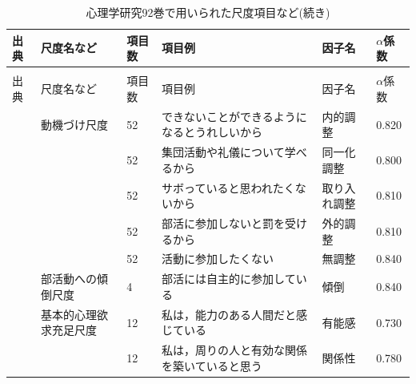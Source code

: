 \begin{landscape}
	\begin{longtable}{p{2cm}p{2cm}p{2cm}p{6cm}p{2cm}p{2cm}}
		\caption{心理学研究92巻で用いられた尺度項目など}
		\label{JPA92Scales} \\
		\hline
		出典                       & 尺度名など                            & 項目数 & 項目例                                                 & 因子名                  & $\alpha$係数 \\ \hline
		\hline \endfirsthead
		\caption[]{心理学研究92巻で用いられた尺度項目など(続き)} \\
		\hline
		出典                       & 尺度名など                            & 項目数 & 項目例                                                 & 因子名                  & $\alpha$係数 \\ \hline
		\hline \endhead
		\textcite{Suzuki202192}     & 動機づけ尺度                           & 52  & できないことができるようになるとうれしいから                              & 内的調整                 & 0.820      \\
		                         &                                  & 52  & 集団活動や礼儀について学べるから                                    & 同一化調整                & 0.800      \\
		                         &                                  & 52  & サボっていると思われたくないから                                    & 取り入れ調整               & 0.810      \\
		                         &                                  & 52  & 部活に参加しないと罰を受けるから                                    & 外的調整                 & 0.810      \\
		                         &                                  & 52  & 活動に参加したくない                                          & 無調整                  & 0.840      \\
		                         & 部活動への傾倒尺度                        & 4   & 部活には自主的に参加している                                      & 傾倒                   & 0.840      \\
		                         & 基本的心理欲求充足尺度                      & 12  & 私は，能力のある人間だと感じている                                   & 有能感                  & 0.730      \\
		                         &                                  & 12  & 私は，周りの人と有効な関係を築いていると思う                              & 関係性                  & 0.780      \\

\end{longtable}
\end{landscape}

